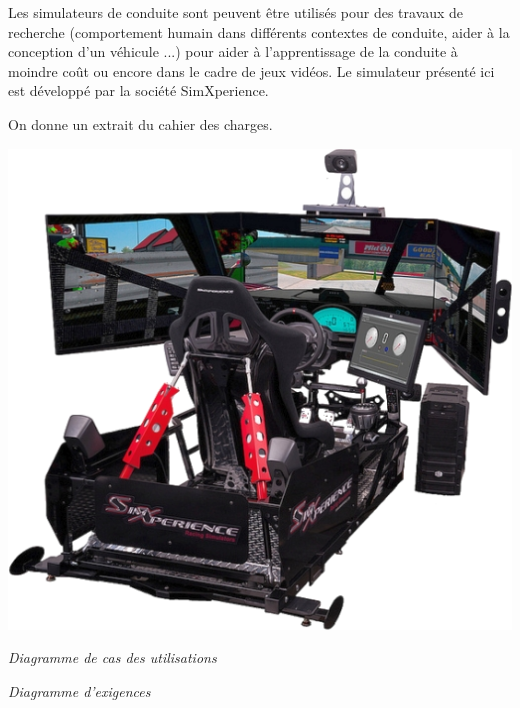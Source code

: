 \documentclass[10pt]{article}
\begin{document}
\begin{minipage}[c]{.7\linewidth}
Les simulateurs de conduite sont peuvent être utilisés pour des travaux de recherche (comportement humain dans différents contextes de conduite, aider à la conception d'un véhicule ...) pour aider à l'apprentissage de la conduite à moindre coût ou encore dans le cadre de jeux vidéos. Le simulateur présenté ici est développé par la société SimXperience. 
\begin{obj} 

\end{obj}

 On donne un extrait du cahier des charges.
 
\end{minipage} \hfill
\begin{minipage}[c]{.25\linewidth}
\begin{center}
\includegraphics[width=\textwidth]{images/Simulateur1}
\end{center}
\end{minipage}

\begin{minipage}[c]{.33\linewidth}
\begin{center}

\textit{Diagramme de cas des utilisations}
\end{center}
\end{minipage} \hfill
\begin{minipage}[c]{.63\linewidth}
\begin{center}

\textit{Diagramme d'exigences}
\end{center}
\end{minipage}

\vspace{.25cm}
\end{document}
